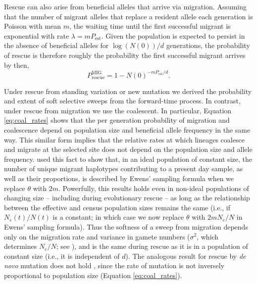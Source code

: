 \documentclass[]{article}
\begin{document}
Rescue can also arise from beneficial alleles that arrive via migration.
Assuming that the number of migrant alleles that replace a resident allele each generation is Poisson with mean $m$, the waiting time until the first successful migrant is exponential with rate $\lambda = m P_\mathrm{est}$.
Given the population is expected to persist in the absence of beneficial alleles for $\log(N(0))/d$ generations, the probability of rescue is therefore roughly the probability the first successful migrant arrives by then,
\begin{equation}
P_\mathrm{rescue}^\mathrm{MIG} = 1 - N(0)^{-m P_\mathrm{est}/d}.
\end{equation}

Under rescue from standing variation or new mutation we derived the probability and extent of soft selective sweeps from the forward-time process. 
In contrast, under rescue from migration we use the coalescent.
In particular, Equation \ref{eq:coal_rates} shows that the per generation probability of migration and coalescence depend on population size and beneficial allele frequency in the same way. 
This similar form implies that the relative rates at which lineages coalesce and migrate at the selected site does not depend on the population size and allele frequency. 
\cite{pennings2006soft2} used this fact to show that, in an ideal population of constant size, the number of unique migrant haplotypes contributing to a present day sample, as well as their proportions, is described by Ewens' sampling formula \citep[pages 334\textit{ff} in][]{ewens2004mathematical} when we replace $\theta$ with $2 m$. 
Powerfully, this results holds even in non-ideal populations of changing size \citep[as briefly noted by][p.\ 1081-1082]{pennings2006soft2} -- including during evolutionary rescue -- as long as the relationship between the effective and census population sizes remains the same (i.e., if $N_e(t)/N(t)$ is a constant; in which case we now replace $\theta$ with $2m N_e/N$ in Ewens' sampling formula). 
Thus the softness of a sweep from migration depends only on the migration rate and variance in gamete numbers ($\sigma^2$, which determines $N_e/N$; see ), and is the same during rescue as it is in a population of constant size (i.e., it is independent of $d$).
The analogous result for rescue by \textit{de novo} mutation does not hold \citep[as it does for a population of constant size,][]{pennings2006soft2}, since the rate of mutation is not inversely proportional to population size (Equation \ref{eq:coal_rates}).  
\end{document}
